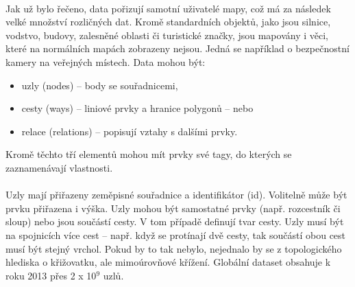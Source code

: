 \documentclass[11pt,a4paper,titlepage,oneside]{book}
\begin{document}
		\paragraph{} Jak už bylo řečeno, data pořizují samotní uživatelé mapy, což má za následek velké množství rozličných dat. Kromě standardních objektů, jako jsou silnice, vodstvo, budovy, zalesněné oblasti či turistické značky, jsou mapovány i věci, které na normálních mapách zobrazeny nejsou. Jedná se například o bezpečnostní kamery na veřejných místech. Data mohou být:
	\begin{itemize}
		\item uzly (nodes) -- body se souřadnicemi,


		\item cesty (ways) -- liniové prvky a hranice polygonů -- nebo


		\item relace (relations) -- popisují vztahy s dalšími prvky.
	\end{itemize}
Kromě těchto tří elementů mohou mít prvky své tagy, do kterých se zaznamenávají  vlastnosti. 	


		\paragraph{}Uzly mají přiřazeny zeměpisné souřadnice a identifikátor (id). Volitelně může být prvku přiřazena i výška. Uzly mohou být samostatné prvky (např. rozcestník či sloup) nebo jsou součástí cesty. V tom případě definují tvar cesty. Uzly musí být na spojnicích více cest -- např. když se protínají dvě cesty, tak součástí obou cest musí být stejný vrchol. Pokud by to tak nebylo, nejednalo by se z topologického hlediska o křižovatku, ale mimoúrovňové křížení. Globální dataset obsahuje k roku 2013 přes 2 x 10$^9$ uzlů.

\end{document}
